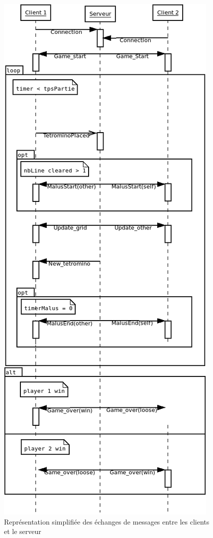 \documentclass[a4paper, 12pt]{article}
\begin{document}
			\begin{figure}[bt]
				\centering
				\includegraphics[scale=0.45]{img/echanges.png}
				\caption{Représentation simplifiée des échanges de messages entre les clients et le serveur}
				\label{fig:echange}
			\end{figure}
\end{document}
